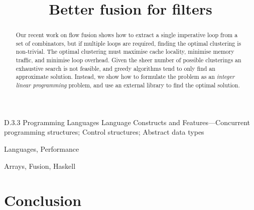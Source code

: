 \documentclass[preprint]{sigplanconf}
\begin{document}
\title{Better fusion for filters}


\maketitle
\makeatactive

\begin{abstract}
Our recent work on flow fusion shows how to extract a single imperative loop from a set of combinators, but if multiple loops are required, finding the optimal clustering is non-trivial.
The optimal clustering must maximise cache locality, minimise memory traffic, and minimise loop overhead.
Given the sheer number of possible clusterings an exhaustive search is not feasible, and greedy algorithms tend to only find an approximate solution.
Instead, we show how to formulate the problem as an \emph{integer linear programming} problem, and use an external library to find the optimal solution.
\end{abstract}

\category
	{D.3.3}
	{Programming Languages}
	{Language Constructs and Features---Concurrent programming structures; Control structures; Abstract data types}

\terms
	Languages, Performance

\keywords
	Arrays, Fusion, Haskell








\section{Conclusion}



\end{document}
